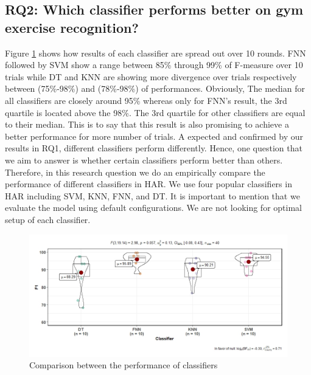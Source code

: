 \documentclass[journal,article,submit,moreauthors,pdftex]{Definitions/mdpi}
\newcommand{\hosein}[1]{\textcolor{orange}{{\it [Hosein: #1]}}}
\begin{document}

\subsection{RQ2: Which classifier performs better on gym exercise recognition?}
Figure \ref{fig:classification_comparison} shows how results of each classifier are spread out over 10 rounds. FNN followed by SVM show a range between 85\% through 99\% of F-measure over 10 trials while DT and KNN are showing more divergence over trials respectively between (75\%-98\%) and (78\%-98\%) of performances. Obviously, The median for all classifiers are closely around 95\% whereas only for FNN's result, the 3rd quartile is located above the 98\%. The 3rd quartile for other classifiers are equal to their median. This is to say that this result is also promising to achieve a better performance for more number of trials.
A expected and confirmed by our results in RQ1, different classifiers perform differently. Hence, one question that we aim to answer is whether certain classifiers perform better than others. Therefore, in this research question we do an empirically compare the performance of different classifiers in HAR. We use four popular classifiers in HAR including SVM, KNN, FNN, and DT. It is important to mention that we evaluate the model using default configurations. We are not looking for optimal setup of each classifier.

\begin{figure}[H]
	\centering
	\includegraphics[width=14 cm]{Definitions/images/F1_results_vioPlot.jpeg}
	\caption{Comparison between the performance of classifiers}
	\label{fig:classification_comparison}
\end{figure}
\end{document}
